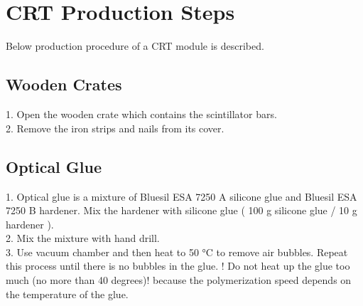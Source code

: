 \documentclass[a4paper]{article}\linespread{1.4}
\begin{document}

\clearpage
\section{\\ CRT Production Steps} \label{App:AppendixC}
Below production procedure of a CRT module is described.

\subsection{Wooden Crates}
1.	Open the wooden crate which contains the scintillator bars.
\\2.	Remove the iron strips and nails from its cover.

\subsection{Optical Glue}
1.	Optical glue is a mixture of Bluesil ESA 7250 A silicone glue and  Bluesil ESA 7250 B hardener. Mix the hardener with silicone glue
 ( 100 g silicone glue / 10 g hardener ).
\\2. Mix the mixture with hand drill.
\\3.  Use vacuum chamber and then heat to 50 °C  to remove air bubbles. Repeat this process until there is no bubbles in the glue. 
! Do not heat up the glue too much (no more than 40 degrees)! because the polymerization speed depends on the temperature of the glue.
\end{document}
